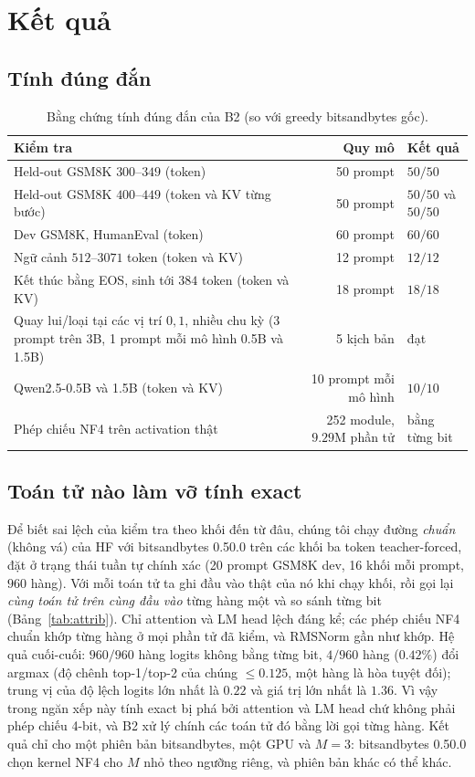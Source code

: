 \section{Kết quả}\label{sec:results}
\subsection{Tính đúng đắn}
\begin{table}[t]
\centering\small
\caption{Bằng chứng tính đúng đắn của B2 (so với greedy bitsandbytes gốc).}\label{tab:exact}
\begin{tabularx}{\textwidth}{@{}Xrl@{}}
\toprule
Kiểm tra & Quy mô & Kết quả\\\midrule
Held-out GSM8K $300$--$349$ (token) & 50 prompt & $50/50$\\
Held-out GSM8K $400$--$449$ (token và KV từng bước) & 50 prompt & $50/50$ và $50/50$\\
Dev GSM8K, HumanEval (token) & 60 prompt & $60/60$\\
Ngữ cảnh $512$--$3071$ token (token và KV) & 12 prompt & $12/12$\\
Kết thúc bằng EOS, sinh tới $384$ token (token và KV) & 18 prompt & $18/18$\\
Quay lui/loại tại các vị trí $0,1$, nhiều chu kỳ (3 prompt trên 3B, 1 prompt mỗi mô hình 0.5B và 1.5B) & 5 kịch bản & đạt\\
Qwen2.5-0.5B và 1.5B (token và KV) & 10 prompt mỗi mô hình & $10/10$\\
Phép chiếu NF4 trên activation thật & 252 module, $9.29$M phần tử & bằng từng bit\\
\bottomrule
\end{tabularx}
\end{table}

\subsection{Toán tử nào làm vỡ tính exact}\label{sec:attrib}
Để biết sai lệch của kiểm tra theo khối đến từ đâu, chúng tôi chạy đường \emph{chuẩn} (không vá) của HF với bitsandbytes 0.50.0 trên các khối ba token teacher-forced, đặt ở trạng thái tuần tự chính xác (20 prompt GSM8K dev, 16 khối mỗi prompt, $960$ hàng). Với mỗi toán tử ta ghi đầu vào thật của nó khi chạy khối, rồi gọi lại \emph{cùng toán tử trên cùng đầu vào} từng hàng một và so sánh từng bit (Bảng~\ref{tab:attrib}). Chỉ attention và LM head lệch đáng kể; các phép chiếu NF4 chuẩn khớp từng hàng ở mọi phần tử đã kiểm, và RMSNorm gần như khớp. Hệ quả cuối-cuối: $960/960$ hàng logits không bằng từng bit, $4/960$ hàng ($0.42\%$) đổi argmax (độ chênh top-1/top-2 của chúng $\le 0.125$, một hàng là hòa tuyệt đối); trung vị của độ lệch logits lớn nhất là $0.22$ và giá trị lớn nhất là $1.36$. Vì vậy trong ngăn xếp này tính exact bị phá bởi attention và LM head chứ không phải phép chiếu 4-bit, và B2 xử lý chính các toán tử đó bằng lời gọi từng hàng. Kết quả chỉ cho một phiên bản bitsandbytes, một GPU và $M{=}3$: bitsandbytes 0.50.0 chọn kernel NF4 cho $M$ nhỏ theo ngưỡng riêng, và phiên bản khác có thể khác.

